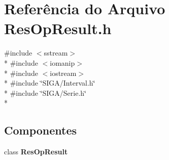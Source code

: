 \section{Referência do Arquivo Res\+Op\+Result.\+h}
\label{_2_models_2_res_op_result_8h}
{\ttfamily \#include $<$sstream$>$}\\*
{\ttfamily \#include $<$iomanip$>$}\\*
{\ttfamily \#include $<$iostream$>$}\\*
{\ttfamily \#include \char`\"{}S\+I\+G\+A/\+Interval.\+h\char`\"{}}\\*
{\ttfamily \#include \char`\"{}S\+I\+G\+A/\+Serie.\+h\char`\"{}}\\*
\subsection*{Componentes}
\begin{DoxyCompactItemize}
\item 
class {\bf Res\+Op\+Result}
\end{DoxyCompactItemize}
